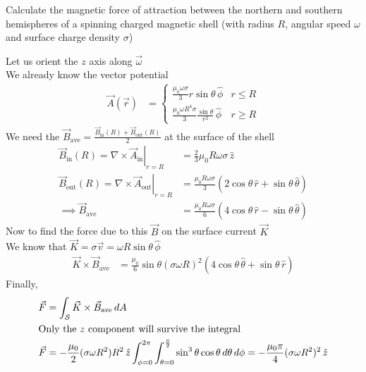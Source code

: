 \documentclass[../main.tex]{subfiles}
\begin{document}
\begin{questions}

\question Calculate the magnetic force of attraction between the northern and southern hemispheres of a spinning charged magnetic shell (with radius $R$, angular speed $\omega$ and surface charge density $\sigma$)
\begin{solution}
	Let us orient the $z$ axis along $\vec{\omega}$\\ 
	We already know the vector potential
	\begin{align}
		\vec{A}(\vec{r}) &=
		\begin{cases}
			\frac{\mu_0\omega\sigma}{3}r\sin\theta\,\hat{\phi} & r\leq R\\
			\frac{\mu_0\omega R^4\sigma}{3}\frac{\sin\theta}{r^2}\,\hat{\phi} & r\geq R
		\end{cases}
	\end{align}
	We need the $\vec{B}_\text{ave}=\frac{\vec{B}_\text{in}(R) + \vec{B}_\text{out}(R)}{2}$ at the surface of the shell
	\begin{align}
		\vec{B}_\text{in}(R)=\left.\nabla\times\vec{A}_\text{in}\right|_{r=R}&=\frac{2}{3}\mu_0R\omega\sigma\,\hat{z}\\
		\vec{B}_\text{out}(R)  =\left.\nabla\times\vec{A}_\text{out}\right|_{r=R}&=\frac{\mu_0R\omega\sigma}{3}(2\cos\theta\,\hat{r}+\sin\theta\,\hat{\theta})\\
		\implies \vec{B}_\text{ave} &= \frac{\mu_0R\omega\sigma}{6}(4\cos\theta\,\hat{r}-\sin\theta\,\hat{\theta})
	\end{align}
	Now to find the force due to this $\vec{B}$ on the surface current $\vec{K}$\\
	We know that $\vec{K}=\sigma\vec{v}=\omega R\sin\theta\,\hat{\phi}$
	\begin{align}
		\vec{K}\times\vec{B}_\text{ave} &= \frac{\mu_0}{6}\sin\theta(\sigma\omega R)^2(4\cos\theta\,\hat{\theta}+\sin\theta\,\hat{r})
	\end{align}
	Finally,
	\begin{align}
		\vec{F} &= \int_\mathcal{S}\vec{K}\times\vec{B}_\text{ave}\,dA\\
		\intertext{Only the $z$ component will survive the integral}
		\vec{F} &= -\frac{\mu_0}{2}(\sigma\omega R^2)R^2\,\hat{z}\int_{\phi=0}^{2\pi}\int_{\theta=0}^{\frac{\pi}{2}}\sin^3\theta\cos\theta\,d\theta\,d\phi = -\frac{\mu_0\pi}{4}(\sigma\omega R^2)^2\,\hat{z}
	\end{align}
\end{solution}
	

\end{questions}
\end{document}
